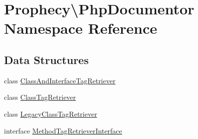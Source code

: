 \hypertarget{namespace_prophecy_1_1_php_documentor}{}\section{Prophecy\textbackslash{}Php\+Documentor Namespace Reference}
\label{namespace_prophecy_1_1_php_documentor}
\subsection*{Data Structures}
\begin{DoxyCompactItemize}
\item 
class \mbox{\hyperlink{class_prophecy_1_1_php_documentor_1_1_class_and_interface_tag_retriever}{Class\+And\+Interface\+Tag\+Retriever}}
\item 
class \mbox{\hyperlink{class_prophecy_1_1_php_documentor_1_1_class_tag_retriever}{Class\+Tag\+Retriever}}
\item 
class \mbox{\hyperlink{class_prophecy_1_1_php_documentor_1_1_legacy_class_tag_retriever}{Legacy\+Class\+Tag\+Retriever}}
\item 
interface \mbox{\hyperlink{interface_prophecy_1_1_php_documentor_1_1_method_tag_retriever_interface}{Method\+Tag\+Retriever\+Interface}}
\end{DoxyCompactItemize}
